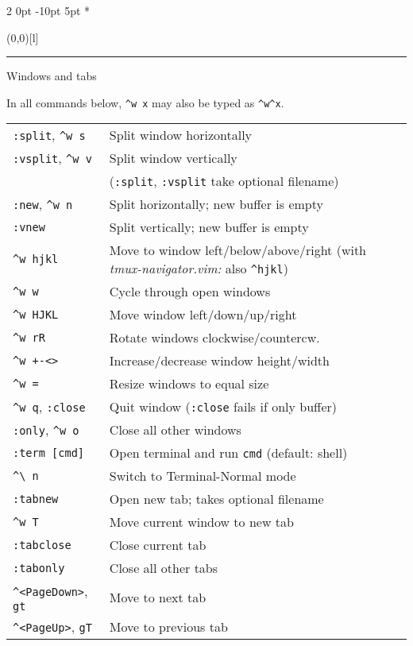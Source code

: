 \documentclass[a4paper, landscape, 10pt]{article}
\makeatletter
\renewcommand{\subsection}{%
    \@startsection{subsection}%
        {2}%
        {0pt}%
        {-10pt}%
        {5pt}%
        {\fontsize{12pt}{12pt}\selectfont\bfseries\itshape\color{accentcolor}}}
\newcommand{\subtopic}[1]{\subsection*{\protect\makebox(0,0)[l]{\color{accentcolor!20}\rule[7pt]{\columnwidth}{19pt}}\hspace{.5em}#1}}
\makeatother
\begin{document}
\begin{multicols*}{3}
\subtopic{Windows and tabs}
In all commands below, \verb|^w x| may also be typed as \verb|^w^x|.
\vspace{.25\baselineskip}

    \begin{tabularx}{\columnwidth}{l>{\raggedright\arraybackslash}X}
\verb|:split|, \verb|^w s|
        &Split window horizontally\\
\verb|:vsplit|, \verb|^w v|
        &Split window vertically\\
        &(\verb|:split|, \verb|:vsplit| take optional filename)\\
\verb|:new|, \verb|^w n|
        &Split horizontally; new buffer is empty\\
\verb|:vnew|
        &Split vertically; new buffer is empty\\
\verb|^w hjkl|
        &Move to window left/below/above/right \linebreak(with \textit{tmux-navigator.vim:} also \verb|^hjkl|)\\
\verb|^w w|
        &Cycle through open windows\\
\verb|^w HJKL|
        &Move window left/down/up/right\\
\verb|^w rR|
        &Rotate windows clockwise/countercw.\\
\verb|^w +-<>|
        &Increase/decrease window height/width\\
\verb|^w =|
        &Resize windows to equal size\\
\verb|^w q|, \verb|:close|
        &Quit window (\verb|:close| fails if only buffer)\\
\verb|:only|, \verb|^w o|
        &Close all other windows\\

\verb|:term [cmd]|
        &Open terminal and run \verb|cmd| (default: shell)\\
\verb|^\ n|
        &Switch to Terminal-Normal mode\\

\verb|:tabnew|
        &Open new tab; takes optional filename\\
\verb|^w T|
        &Move current window to new tab\\
\verb|:tabclose|
        &Close current tab\\
\verb|:tabonly|
        &Close all other tabs\\
\verb|^<PageDown>|, \verb|gt|
        &Move to next tab\\
\verb|^<PageUp>|, \verb|gT|
        &Move to previous tab
    \end{tabularx}




\end{multicols*}
\end{document}
